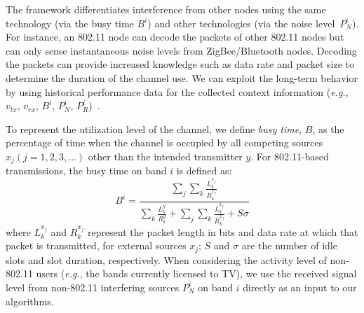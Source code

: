 The framework differentiates interference from other nodes using the same technology (via the busy time $B^i$) and other technologies (via the noise level~$P_N^i$). For instance, an 802.11 node can decode the packets of other 802.11 nodes but can only sense
instantaneous noise levels from ZigBee/Bluetooth nodes. 
Decoding the packets can provide increased knowledge such as 
data rate and packet size to determine the duration of the channel use.
We can exploit the long-term behavior by using historical performance
data for the collected context information
({\it e.g.}, $v_{tx}$, $v_{rx}$, $B^i$, $P_N^i$, $P_R^i$)~\cite{meikle2012global}. 


To represent the utilization level of the channel, we define \emph{busy time}, $B$,
as the percentage of time when the channel is occupied by 
all competing sources $x_j (j = 1, 2, 3, ...)$ other than the intended transmitter $y$. 
For 802.11-based transmissions, the busy time on band $i$ is defined as:
\begin{equation}
\label{eqn:80211activity}
B^i = \frac{\sum_j{\sum_k{\frac{L_k^{x_j}}{R_k^{x_j}}}}}{\sum_k{\frac{L_k^y}{R_k^y}}+\sum_j{\sum_k{\frac{L_k^{x_j}}{R_k^{x_j}}}}+S\sigma}
\end{equation}
where $L_k^{x_j}$ and $R_k^{x_j}$ represent the packet length in bits and data
rate at which that packet is transmitted, for external sources $x_j$;
$S$ and $\sigma$ are the number of idle slots and slot duration, respectively. 
When considering the activity level of non-802.11 users 
({\it e.g.}, the bands currently licensed to TV),
we use the received signal level from non-802.11 interfering sources $P_N^i$ 
on band $i$ directly as an input to our algorithms. 

